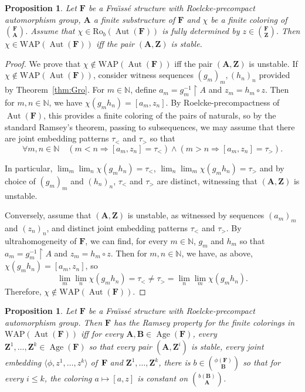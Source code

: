 \documentclass[11pt]{article}
\newtheorem{prop}[theo]{Proposition}
\theoremstyle{definition}
\numberwithin{equation}{section}
\numberwithin{figure}{section}
\numberwithin{table}{section}
\newcommand{\N}{\mathbb{N}}
\newcommand*{\mA}{\mathbf{A}}
\newcommand*{\mB}{\mathbf{B}}
\newcommand*{\mF}{\mathbf{F}}
\newcommand*{\mZ}{\mathbf{Z}}
\newcommand{\restrict}[2]{#1 \upharpoonright #2}
\DeclareMathOperator{\Aut}{Aut}
\DeclareMathOperator{\Age}{Age}
\newcommand{\ROB}{\mathrm{Ro}_{b}}
\newcommand{\WAP}{\mathrm{WAP}}
\newcommand*{\Mk}{\mkern -2mu}
\newcommand*{\MK}{\mkern 2mu}
\let\oldforall\forall
\renewcommand*{\forall}{\mathrel{\oldforall}}
\begin{document}
\begin{prop}\label{prop:WAPStable}
Let $\mF$ be a Fra\"{\i}ss\'e structure with Roelcke-precompact automorphism group, $\mA$ a finite substructure of $\mF$ and $\chi$ be a finite coloring of $\binom{\mF}{\mA}$. Assume that $\chi\in \ROB(\Aut(\mF))$ is fully determined by $z\in \binom{\mF}{\mZ}$. Then $\chi\in \WAP(\Aut(\mF))$ iff the pair $(\mA, \mZ)$ is stable.
\end{prop}

\begin{proof}
We prove that $\chi\notin \WAP(\Aut(\mF))$ iff the pair $(\mA, \mZ)$ is unstable. If $\chi\notin \WAP(\Aut(\mF))$, consider witness sequences $(g_{m})_{m}, (h_{n})_{n}$ provided by Theorem~\ref{thm:Gro}. For $m\in \N$, define $a_{m}=\restrict{g_{m}^{-1}}{A}$ and $z_{m}=h_{m}\circ z$. Then for $m,n\in \N$, we have $\chi(g_{m}h_{n})=[a_{m},z_{n}]$. By Roelcke-precompactness of $\Aut(\mF)$, this provides a finite coloring of the pairs of naturals, so by the standard Ramsey's theorem, passing to subsequences, we may assume that there are joint embedding patterns $\tau_{<}$ and $\tau_{>}$ so that
\[
\forall m,n\in \N \quad (m<n \Rightarrow [a_{m},z_{n}]=\tau_{<})\wedge (m>n \Rightarrow [a_{m},z_{n}]=\tau_{>}).
\]

In particular, $\lim_{m}\lim_{n}\chi(g_{m}h_{n})=\tau_{<}$, $\lim_{n}\lim_{m}\chi(g_{m}h_{n})=\tau_{>}$ and by choice of $(g_{m})_{m}$ and $(h_{n})_{n}$, $\tau_{<}$ and $\tau_{>}$ are distinct, witnessing that $(\mA, \mZ)$ is unstable.

Conversely, assume that $(\mA, \mZ)$ is unstable, as witnessed by sequences $(a_{m})_{m}$ and $(z_{n})_{n}$, and distinct joint embedding patterns $\tau_{<}$ and $\tau_{>}$. By ultrahomogeneity of $\mF$, we can find, for every $m\in \N$, $g_{m}$ and $h_{m}$ so that $a_{m}=\restrict{g_{m}^{-1}}{A}$ and $z_{m}=h_{m}\circ z$. Then for $m,n\in \N$, we have, as above, $\chi(g_{m}h_{n})=[a_{m},z_{n}]$, so
\[
\lim_{m}\lim_{n}\chi(g_{m}h_{n})=\tau_{<}\neq \tau_{>} = \lim_{n}\lim_{m}\chi(g_{m}h_{n}).
\]
Therefore, $\chi\notin \WAP(\Aut(\mF))$.
\end{proof}

\begin{prop}
Let $\mF$ be a Fra\"{\i}ss\'e structure with Roelcke-precompact automorphism group. Then $\mF$ has the Ramsey property for the finite colorings in $\WAP(\Aut(\mF))$ iff for every $\mA, \mB \in \Age(\mF)$, every $\mZ^{1},\ldots,\mZ^{k}\in \Age(\mF)$ so that every pair $(\mA, \mZ^{i})$ is stable, every joint embedding $\langle \phi,z^{1},\ldots,z^{k}\rangle$ of $\MK\mF\Mk$ and $\mZ^{1},\ldots,\mZ^{k}$, there is $b\in \binom{\phi(\mF)}{\mB}$ so that for every $i\leq k$, the coloring $a\mapsto [a,z]$ is constant on $\binom{b(\mB)}{\mA}$.
\end{prop}
\end{document}
